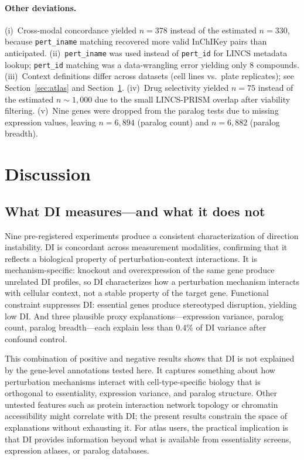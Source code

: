 \documentclass[11pt]{article}
\begin{document}
\paragraph{Other deviations.}
(i)~Cross-modal concordance yielded $n = 378$ instead of the estimated $n = 330$, because
\texttt{pert\_iname} matching recovered more valid InChIKey pairs than
anticipated.
(ii)~\texttt{pert\_iname} was used instead of \texttt{pert\_id} for
LINCS metadata lookup; \texttt{pert\_id} matching was a data-wrangling
error yielding only 8 compounds.
(iii)~Context definitions differ across datasets (cell lines vs.\ plate
replicates); see Section~\ref{sec:atlas} and Section~\ref{sec:discussion}.
(iv)~Drug selectivity yielded $n = 75$ instead of the estimated $n \sim 1{,}000$ due
to the small LINCS-PRISM overlap after viability filtering.
(v)~Nine genes were dropped from the paralog tests due to missing
expression values, leaving $n = 6{,}894$ (paralog count) and
$n = 6{,}882$ (paralog breadth).


\section{Discussion}
\label{sec:discussion}

\subsection{What DI measures---and what it does not}

Nine pre-registered experiments produce a consistent characterization of
direction instability.  DI is concordant across measurement modalities,
confirming that it reflects a biological property of perturbation-context
interactions.  It is mechanism-specific: knockout and overexpression
of the same gene produce unrelated DI profiles, so DI characterizes how
a perturbation mechanism interacts with cellular context, not a stable
property of the target gene.  Functional constraint suppresses DI:
essential genes produce stereotyped disruption, yielding low DI.  And
three plausible proxy explanations---expression variance, paralog count,
paralog breadth---each explain less than 0.4\% of DI variance after
confound control.

This combination of positive and negative results shows that DI is not
explained by the gene-level annotations tested here.  It captures
something about how perturbation mechanisms interact with
cell-type-specific biology that is orthogonal to essentiality,
expression variance, and paralog structure.  Other untested features
such as protein interaction network topology or chromatin accessibility
might correlate with DI; the present results constrain the space of
explanations without exhausting it.  For atlas users, the practical
implication is that DI provides information beyond what is available
from essentiality screens, expression atlases, or paralog databases.
\end{document}
